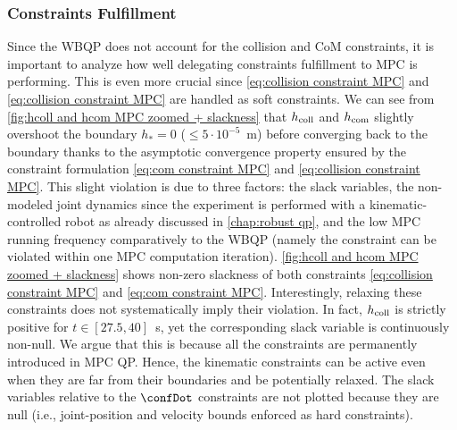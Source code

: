 \subsubsection{Constraints Fulfillment}
Since the WBQP does not account for the collision and CoM constraints, it is important to analyze how well delegating constraints fulfillment to MPC is performing. This is even more crucial since \cref{eq:collision constraint MPC} and \cref{eq:collision constraint MPC} are handled as soft constraints. %
We can see from \cref{fig:hcoll and hcom MPC zoomed + slackness} that $h_{\rm coll}$ and $h_{\rm com}$ slightly overshoot the boundary $h_{*}=0$ ($\leq 5\cdot10^{-5}$~m) before converging back to the boundary thanks to the asymptotic convergence property ensured by the constraint formulation \cref{eq:com constraint MPC} and \cref{eq:collision constraint MPC}. This slight violation is due to three factors:  the slack variables, the non-modeled joint dynamics since the experiment is performed with a kinematic-controlled robot as already discussed in \cref{chap:robust qp}, and the low MPC running frequency comparatively to the WBQP (namely the constraint can be violated within one MPC computation iteration).
\cref{fig:hcoll and hcom MPC zoomed + slackness} shows non-zero slackness of both constraints \cref{eq:collision constraint MPC} and \cref{eq:com constraint MPC}.  Interestingly, relaxing these constraints does not systematically imply their violation. In fact, $h_{\rm coll}$ is strictly positive for $t\in\left[27.5,40\right]$~s, yet the corresponding slack variable is continuously non-null. We argue that this is because all the constraints are permanently introduced in MPC QP. Hence, the kinematic constraints can be active even when they are far from their boundaries and be potentially relaxed.
The slack variables relative to the $\confDot$ constraints are not plotted because they are null (i.e., joint-position and velocity bounds enforced as hard constraints).
